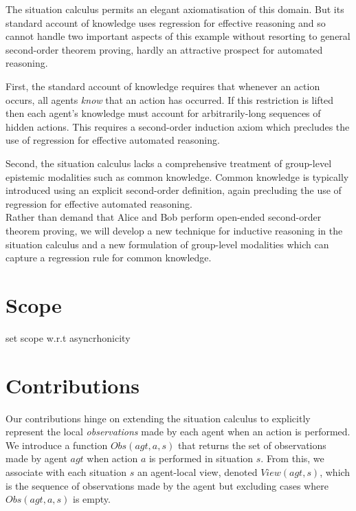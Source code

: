 The situation calculus permits an elegant axiomatisation of this domain.
But its standard account of knowledge uses regression for effective
reasoning and so cannot handle two important aspects of this example
without resorting to general second-order theorem proving, hardly
an attractive prospect for automated reasoning.

First, the standard account of knowledge requires that whenever an
action occurs, all agents \emph{know} that an action has occurred.
If this restriction is lifted then each agent's knowledge must account
for arbitrarily-long sequences of hidden actions. This requires a
second-order induction axiom which precludes the use of regression
for effective automated reasoning.

Second, the situation calculus lacks a comprehensive treatment of
group-level epistemic modalities such as common knowledge. Common
knowledge is typically introduced using an explicit second-order definition,
again precluding the use of regression for effective automated reasoning.\\


Rather than demand that Alice and Bob perform open-ended second-order
theorem proving, we will develop a new technique for inductive reasoning
in the situation calculus and a new formulation of group-level modalities
which can capture a regression rule for common knowledge.

\newpage{}


\section{Scope}

set scope w.r.t asyncrhonicity


\section{Contributions}

Our contributions hinge on extending the situation calculus to explicitly
represent the local \emph{observations} made by each agent when an
action is performed. We introduce a function $Obs(agt,a,s)$ that
returns the set of observations made by agent $agt$ when action $a$
is performed in situation $s$. From this, we associate with each
situation $s$ an agent-local view, denoted $View(agt,s)$, which
is the sequence of observations made by the agent but excluding cases
where $Obs(agt,a,s)$ is empty.\\


